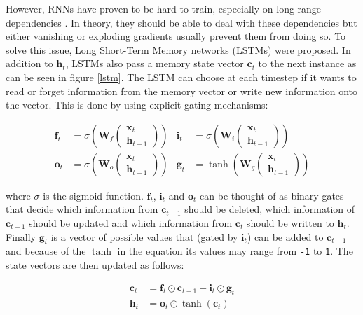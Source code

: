 However, RNNs have proven to be hard to train, especially on long-range dependencies \cite{hochreiter_rnn}. In theory, they should be able to deal with these dependencies but either vanishing or exploding gradients usually prevent them from doing so. To solve this issue, Long Short-Term Memory networks (LSTMs) \cite{lstm} were proposed. In addition to \(\mathbf{h}_t\), LSTMs also pass a memory state vector \(\mathbf{c}_t\) to the next instance as can be seen in figure \ref{lstm}. The LSTM can choose at each timestep if it wants to read or forget information from the memory vector or write new information onto the vector. This is done by using explicit gating mechanisms:

\begin{align*}
  \mathbf{f}_t &= \sigma \left(\mathbf{W}_f \begin{pmatrix} \mathbf{x}_t \\ \mathbf{h}_{t-1} \end{pmatrix} \right) &
  \mathbf{i}_t &= \sigma \left(\mathbf{W}_i \begin{pmatrix} \mathbf{x}_t \\ \mathbf{h}_{t-1} \end{pmatrix} \right) \\
  \mathbf{o}_t &= \sigma \left(\mathbf{W}_o \begin{pmatrix} \mathbf{x}_t \\ \mathbf{h}_{t-1} \end{pmatrix} \right) &
  \mathbf{g}_t &= \tanh \left(\mathbf{W}_g \begin{pmatrix} \mathbf{x}_t \\ \mathbf{h}_{t-1} \end{pmatrix} \right)
\end{align*}

\noindent where \(\sigma\) is the sigmoid function. \(\mathbf{f}_t\), \(\mathbf{i}_t\) and \(\mathbf{o}_t\) can be thought of as binary gates that decide which information from \(\mathbf{c}_{t-1}\) should be deleted, which information of \(\mathbf{c}_{t-1}\) should be updated and which information from \(\mathbf{c}_t\) should be written to \(\mathbf{h}_t\).  Finally \(\mathbf{g}_t\) is a vector of possible values that (gated by \(\mathbf{i}_t\)) can be added to \(\mathbf{c}_{t-1}\) and because of the \(\tanh\) in the equation its values may range from \texttt{-1} to \texttt{1}. The state vectors are then updated as follows:

\begin{align*}
  \mathbf{c}_t &= \mathbf{f}_t \odot \mathbf{c}_{t-1} + \mathbf{i}_t \odot \mathbf{g}_t \\
  \mathbf{h}_t &= \mathbf{o}_t \odot \tanh(\mathbf{c}_t)
\end{align*}


